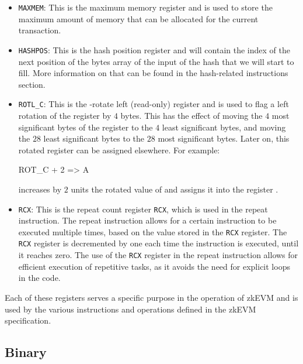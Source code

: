 \begin{itemize}
    \item \texttt{MAXMEM}: This is the maximum memory register and is used to store the maximum amount of memory that can be allocated for the current transaction.
    
    \item \texttt{HASHPOS}: This is the hash position register and will contain the index of the next position of the bytes array of the input of the hash that we will start to fill. More information on that can be found in the hash-related instructions section. 
    
    \item \texttt{ROTL\_C}: This is the \C-rotate left (read-only) register and is used to flag a left rotation of the \C register by $4$ bytes. This has the effect of moving the $4$ most significant bytes of the \C register to the $4$ least significant bytes, and moving the $28$ least significant bytes to the $28$ most significant bytes. Later on, this rotated \C register can be assigned elsewhere. For example:
    
    \begin{zkasm}
        ROT_C + 2 => A
    \end{zkasm}
    increases by $2$ units the rotated value of \C and assigns it into the register \A.
    
    \item \texttt{RCX}: This is the repeat count register \texttt{RCX}, which is used in the repeat instruction. The repeat instruction allows for a certain instruction to be executed multiple times, based on the value stored in the \texttt{RCX} register. The \texttt{RCX} register is decremented by one each time the instruction is executed, until it reaches zero. The use of the \texttt{RCX} register in the repeat instruction allows for efficient execution of repetitive tasks, as it avoids the need for explicit loops in the code.
    
\end{itemize}

Each of these registers serves a specific purpose in the operation of zkEVM and is used by the various instructions and operations defined in the zkEVM specification.








\subsection{Binary} \label{sec:binary-sm}

